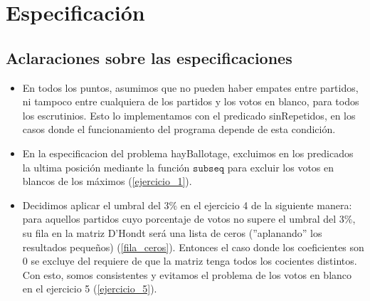 \documentclass[10pt,a4paper]{article}
\newcommand{\predRef}{\texttt}
\begin{document}
\maketitle

\section{Especificación}

\subsection*{Aclaraciones sobre las especificaciones}
\begin{itemize}
  \item En todos los puntos, asumimos que no pueden haber empates entre partidos, ni tampoco entre cualquiera de los partidos y los votos en blanco, para todos los escrutinios. Esto lo implementamos con el predicado sinRepetidos, en los casos donde el funcionamiento del programa depende de esta condición.
  \item En la especificacion del problema hayBallotage, excluimos en los predicados la ultima posición mediante la función $\predRef{subseq}$ para excluir los votos en blancos de los máximos (\ref{ejercicio_1}).
  \item Decidimos aplicar el umbral del $3\%$ en el ejercicio 4 de la siguiente manera: para aquellos partidos cuyo porcentaje de votos no supere el umbral del $3\%$, su fila en la matriz D'Hondt será una lista de ceros (''aplanando'' los resultados pequeños) (\ref{fila_ceros}). Entonces el caso donde los coeficientes son $0$ se excluye del requiere de que la matriz tenga todos los cocientes distintos. Con esto, somos consistentes y evitamos el problema de los votos en blanco en el ejercicio 5 (\ref{ejercicio_5}).
\end{itemize}
\end{document}
